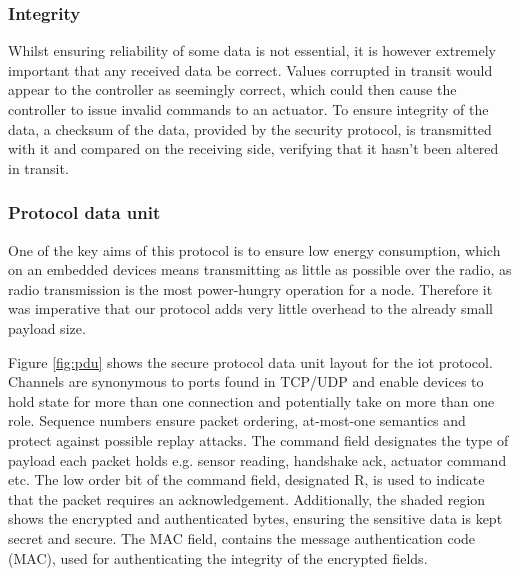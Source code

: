 \documentclass{mpaper}
\begin{document}
\subsubsection*{Integrity} %
\label{ssub:integrity}
Whilst ensuring reliability of some data is not essential, it is however extremely important that any received data be correct. Values corrupted in transit would appear to the controller as seemingly correct, which could then cause the controller to issue invalid commands to an actuator. To ensure integrity of the data, a checksum of the data, provided by the security protocol, is transmitted with it and compared on the receiving side, verifying that it hasn't been altered in transit.  

\subsubsection*{Protocol data unit} %
\label{ssub:protocol_data_unit}
One of the key aims of this protocol is to ensure low energy consumption, which on an embedded devices means transmitting as little as possible over the radio, as radio transmission is the most power-hungry operation for a node. Therefore it was imperative that our protocol adds very little overhead to the already small payload size.

Figure \ref{fig:pdu} shows the secure protocol data unit layout for the iot protocol. Channels are synonymous to ports found in TCP/UDP and enable devices to hold state for more than one connection and potentially take on more than one role. Sequence numbers ensure packet ordering, at-most-one semantics and protect against possible replay attacks. The command field designates the type of payload each packet holds e.g. sensor reading, handshake ack, actuator command etc. The low order bit of the command field, designated R, is used to indicate that the packet requires an acknowledgement. Additionally, the shaded region shows the encrypted and authenticated bytes, ensuring the sensitive data is kept secret and secure. The MAC field, contains the message authentication code (MAC), used for authenticating the integrity of the encrypted fields.

\newcommand{\colorbitbox}[4]{%
\rlap{\bitbox[#1]{#3}{\color{#2}\rule{\width}{\height}}}%
\bitbox[#1]{#3}{#4}}
\end{document}
